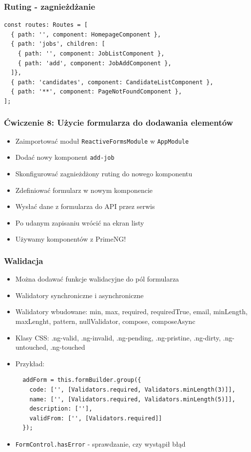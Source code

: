 \documentclass{beamer}
\begin{document}
\begin{frame}[fragile]
    \frametitle{Ruting - zagnieżdżanie}
\begin{lstlisting}
const routes: Routes = [
  { path: '', component: HomepageComponent },
  { path: 'jobs', children: [
    { path: '', component: JobListComponent },
    { path: 'add', component: JobAddComponent },
  ]},
  { path: 'candidates', component: CandidateListComponent },
  { path: '**', component: PageNotFoundComponent },
];
\end{lstlisting}
\end{frame}

\begin{frame}
    \frametitle{Ćwiczenie 8: Użycie formularza do dodawania elementów}
    \begin{itemize}
        \item Zaimportować moduł \lstinline{ReactiveFormsModule} w \lstinline{AppModule}
        \item Dodać nowy komponent \lstinline{add-job}
        \item Skonfigurować zagnieżdżony ruting do nowego komponentu
        \item Zdefiniować formularz w nowym komponencie
        \item Wysłać dane z formularza do API przez serwis
        \item Po udanym zapisaniu wrócić na ekran listy
        \item Używamy komponentów z PrimeNG!
    \end{itemize}
\end{frame}

\begin{frame}[fragile]
    \frametitle{Walidacja}
    \begin{itemize}
        \item Można dodawać funkcje walidacyjne do pól formularza
        \item Walidatory synchroniczne i asynchroniczne
        \item Walidatory wbudowane: min, max, required, requiredTrue, email, minLength, maxLenght, pattern, nullValidator, compose, composeAsync
        \item Klasy CSS: .ng-valid, .ng-invalid, .ng-pending, .ng-pristine, .ng-dirty, .ng-untouched, .ng-touched
        \item Przykład:
\begin{lstlisting}
  addForm = this.formBuilder.group({
    code: ['', [Validators.required, Validators.minLength(3)]],
    name: ['', [Validators.required, Validators.minLength(5)]],
    description: [''],
    validFrom: ['', [Validators.required]]
  });
\end{lstlisting}
        \item \lstinline{FormControl.hasError} - sprawdzanie, czy wystąpił błąd
    \end{itemize}
\end{frame}
\end{document}
